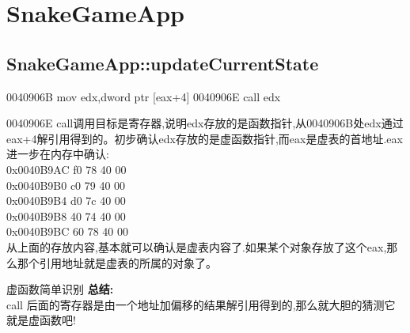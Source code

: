 \documentclass[AutoFakeBold,AutoFakeSlant]{beamer}
\begin{document}
	
	
	\section{SnakeGameApp}
	\subsection{SnakeGameApp::updateCurrentState}
	
	\begin{frame}[fragile]
		\begin{x86asmcode}
0040906B  mov   edx,dword ptr [eax+4]  
0040906E  call  edx\end{x86asmcode}
		0040906E call调用目标是寄存器,说明edx存放的是函数指针,从0040906B处edx通过eax+4解引用得到的。初步确认edx存放的是虚函数指针,而eax是虚表的首地址.eax进一步在内存中确认:\\
		0x0040B9AC  f0 78 40 00  \\
		0x0040B9B0  c0 79 40 00  \\
		0x0040B9B4  d0 7c 40 00  \\
		0x0040B9B8  40 74 40 00  \\
		0x0040B9BC  60 78 40 00  \\
		从上面的存放内容,基本就可以确认是虚表内容了.如果某个对象存放了这个eax,那么那个引用地址就是虚表的所属的对象了。
	\end{frame}
	
	\begin{frame}[fragile]{虚函数简单识别}
	    \textbf{总结:} \\ call 后面的寄存器是由一个地址加偏移的结果解引用得到的,那么就大胆的猜测它就是虚函数吧!	
	\end{frame}
	
\end{document}
